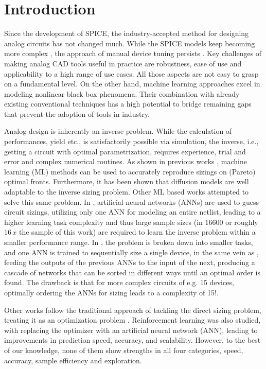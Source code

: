 \documentclass[conference]{IEEEtran}
\begin{document}
\section{Introduction}\label{sec:intro}
	Since the development of SPICE, the industry-accepted method for designing analog circuits has not changed much. While the SPICE models keep becoming more complex \cite{gatermann22mosfet}, the approach of manual device tuning persists \cite{gielen23workshop}. Key challenges of making analog CAD tools useful in practice are robustness, ease of use and applicability to a high range of use cases. All those aspects are not easy to grasp on a fundamental level. On the other hand, machine learning approaches excel in modeling nonlinear black box phenomena. Their combination with already existing conventional techniques has a high potential to bridge remaining gaps that prevent the adoption of tools in industry.
	
	Analog design is inherently an inverse problem. While the calculation of performances, yield etc., is satisfactorily possible via simulation, the inverse, i.e., getting a circuit with optimal parametrization, requires experience, trial and error and complex numerical routines. As shown in previous works \cite{ leibl24inverse, lourenco19pareto}, machine learning (ML) methods can be used to accurately reproduce sizings on (Pareto) optimal fronts. Furthermore, it has been shown \cite{eid24diffusion} that diffusion models are well adaptable to the inverse sizing problem. Other ML based works attempted to solve this same problem. In \cite{lourenco18}, artificial neural networks (ANNs) are used to guess circuit sizings, utilizing only one ANN for modeling an entire netlist, leading to a higher learning task complexity and thus large sample sizes (in \cite{lourenco18} $16600$ or roughly $16 \, x$ the sample of this work) are required to learn the inverse problem within a smaller performance range. In \cite{beaulieu23cascaded}, the problem is broken down into smaller tasks, and one ANN is trained to sequentially size a single device, in the same vein as \cite{leibl24inverse}, feeding the outputs of the previous ANNs to the input of the next, producing a cascade of networks that can be sorted in different ways until an optimal order is found. The drawback is that for more complex circuits of e.g. 15 devices, optimally ordering the ANNs for sizing leads to a complexity of 15!.
	
	Other works follow the traditional approach of tackling the direct sizing problem, treating it as an optimization problem \cite{fayazi23angel, budak23apostle, wolfe03nnmodel, hakhamaneshi23pretraining}. Reinforcement learning was also studied, with \cite{gao23rose, settaluri22reinforcement, zhang23multiagentRL}  replacing the optimizer with an artificial neural network (ANN), leading to improvements in prediction speed, accuracy, and scalability. 
	However, to the best of our knowledge, none of them show strengths in all four categories, speed, accuracy, sample efficiency and exploration.
	
\end{document}
